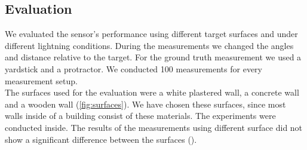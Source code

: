 \subsection{Evaluation}
\label{subs:evaluation}
We evaluated the sensor's performance using different target surfaces and under different lightning conditions. During the measurements we changed the angles and distance relative to the target. For the ground truth measurement we used a yardstick and a protractor. We conducted 100 measurements for every measurement setup.\\
The surfaces used for the evaluation were a white plastered wall, a concrete wall and a wooden wall (\cref{fig:surfaces}). We have chosen these surfaces, since most walls inside of a building consist of these materials. The experiments were conducted inside. The results of the measurements using different surface did not show a significant difference between the surfaces (). 
